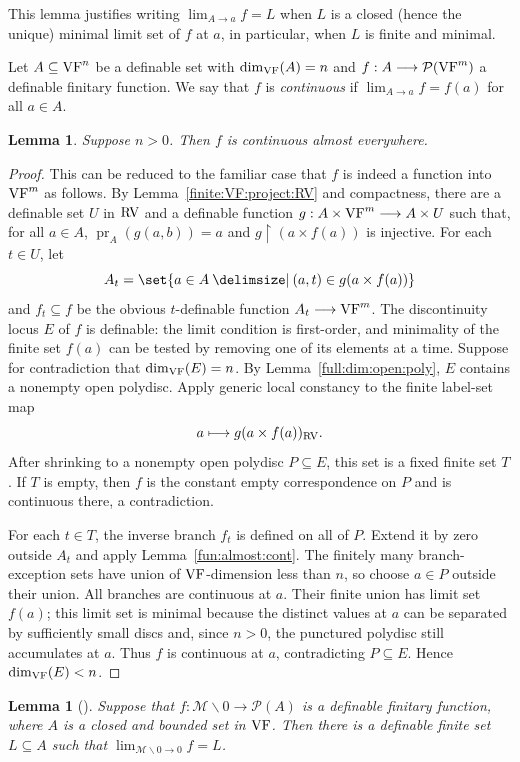 \documentclass[12pt]{amsart}
\newcommand{\memph}[1]{{\color{magenta}\emph{#1}}}
\theoremstyle{plain}
\newtheorem{lem}[thm]{Lemma}
\theoremstyle{definition}
\theoremstyle{remark}
\numberwithin{equation}{section}
\theoremstyle{plain}
\newcommand{\VF}{\textup{VF}}
\newcommand{\RV}{\textup{RV}}
\newcommand{\MM}{\mdl M}
\DeclareMathOperator{\pr}{pr}
\newcommand{\0}{\emptyset}
\newcommand{\mdl}[1]{\mathcal{#1}}  %
\newcommand{\rest}{\upharpoonright}
\newcommand{\fun}{\longrightarrow}
\newcommand{\efun}{\longmapsto}
\newcommand{\sub}{\subseteq}
\newcommand{\mi}{\smallsetminus}
\providecommand\given{}
\newcommand\SetSymbol[1][]{%
\nonscript \: #1 \vert
\allowbreak
\nonscript\:
\mathopen{}}
\renewcommand\given{\SetSymbol[\delimsize]}
\begin{document}
This lemma justifies writing $\lim_{ A \rightarrow a} f = L$ when $L$ is a closed (hence the unique) minimal limit set of $f$ at $a$, in particular, when $L$ is finite and minimal.

Let $A \sub \VF^n$ be a definable set with $\dim_{\VF}(A) = n$ and $f : A \fun \mdl P(\VF^m)$ a definable finitary function. We say that $f$ is \memph{continuous} if $\lim_{ A \rightarrow a} f = f(a)$ for all $a \in A$.

\begin{lem}\label{fini:conti}
Suppose $n>0$. Then $f$ is continuous almost everywhere.
\end{lem}
\begin{proof}
This can be reduced to the familiar case that $f$ is indeed a function into $\VF^m$ as follows. By Lemma~\ref{finite:VF:project:RV} and compactness, there are a definable set $U$ in $\RV$ and a definable function $g: A \times \VF^m \fun A \times U$ such that, for all $a \in A$, $\pr_A(g(a, b)) = a$  and $g \rest (a \times f(a))$ is injective. For each $t \in U$, let
\[
A_t = \set{a \in A \given (a,t) \in g(a \times f(a))}
\]
and $f_t \sub f$ be the obvious $t$-definable function $A_t \fun \VF^m$. The discontinuity locus $E$ of $f$ is definable: the limit condition is first-order, and minimality of the finite set $f(a)$ can be tested by removing one of its elements at a time. Suppose for contradiction that $\dim_{\VF}(E)=n$. By Lemma~\ref{full:dim:open:poly}, $E$ contains a nonempty open polydisc. Apply generic local constancy \cite[Lemma~8.9]{Yin:special:trans} to the finite label-set map
\[
a\efun g(a\times f(a))_{\RV}.
\]
After shrinking to a nonempty open polydisc $P\sub E$, this set is a fixed finite set $T$. If $T$ is empty, then $f$ is the constant empty correspondence on $P$ and is continuous there, a contradiction.

For each $t\in T$, the inverse branch $f_t$ is defined on all of $P$. Extend it by zero outside $A_t$ and apply Lemma~\ref{fun:almost:cont}. The finitely many branch-exception sets have union of $\VF$-dimension less than $n$, so choose $a\in P$ outside their union. All branches are continuous at $a$. Their finite union has limit set $f(a)$; this limit set is minimal because the distinct values at $a$ can be separated by sufficiently small discs and, since $n>0$, the punctured polydisc still accumulates at $a$. Thus $f$ is continuous at $a$, contradicting $P\sub E$. Hence $\dim_{\VF}(E)<n$.
\end{proof}


\begin{lem}[{\cite[Lemma~9.5]{Yin:special:trans}}]\label{lim:exists}
Suppose that $f : \MM \mi 0 \fun \mdl P (A)$ is a definable finitary function, where $A$ is a closed and bounded set in $\VF$. Then there is a definable finite set $L \sub A$ such that $\lim_{\MM \mi 0 \rightarrow 0} f = L$.
\end{lem}
\end{document}
